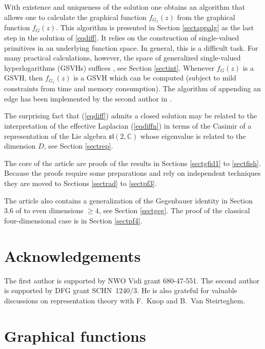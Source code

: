 \documentclass[oneside]{amsart}
\newcommand{\CC}{{\mathbb C}}
\newcommand{\sL}{\mathfrak{sl}}
\theoremstyle{plain}
\begin{document}
With existence and uniqueness of the solution one obtains an algorithm that allows one to calculate the graphical function $f_{G_1}(z)$ from the graphical function $f_G(z)$.
This algorithm is presented in Section \ref{sectappalg} as the last step in the solution of \eqref{eqdiff}.
It relies on the construction of single-valued primitives in an underlying function space. In general, this is a difficult task. For many practical calculations, however,
the space of generalized single-valued hyperlogarithms (GSVHs) suffices \cite{GSVH}, see Section \ref{sectint}. Whenever $f_G(z)$ is a GSVH, then $f_{G_1}(z)$ is a GSVH which can be computed
(subject to mild constraints from time and memory consumption). The algorithm of appending an edge has been implemented by the second author in \cite{Shlog}.

The surprising fact that (\ref{eqdiff}) admits a closed solution may be related to the interpretation of the effective
Laplacian (\ref{eqdiffn}) in terms of the Casimir of a representation of the Lie algebra $\sL(2,\CC)$ whose eigenvalue is related to the dimension $D$, see Section \ref{sectrep}.

The core of the article are proofs of the results in Sections \ref{sectgfid1} to \ref{sectfish}. Because the proofs require some preparations and rely on independent techniques
they are moved to Sections \ref{sectrad} to \ref{sectpf3}.

The article also contains a generalization of the Gegenbauer identity in Section 3.6 of \cite{gf} to even dimensions $\geq4$, see Section \ref{sectgeg}.
The proof of the classical four-dimensional case is in Section \ref{sectpf4}.

\section*{Acknowledgements}
The first author is supported by NWO Vidi grant 680-47-551.
The second author is supported by DFG grant SCHN~1240/3. He is also grateful for valuable discussions on representation theory with F.~Knop and B.~Van Steirteghem.

\section{Graphical functions}\label{sectgf}
\end{document}
